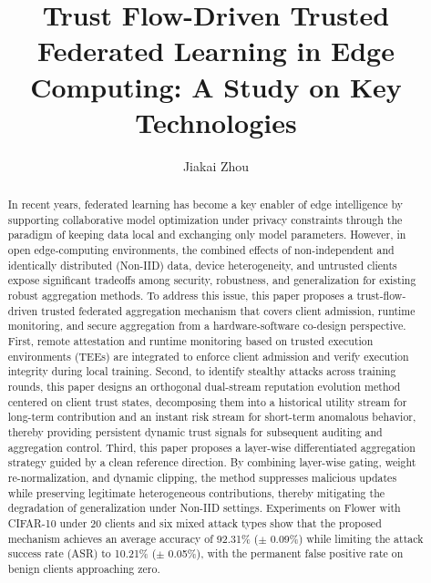 \documentclass[runningheads,orivec]{llncs}
\begin{document}
\title{Trust Flow-Driven Trusted Federated Learning in Edge Computing: A Study on Key Technologies}

\author{Jiakai Zhou}
\institute{}

\maketitle

\begin{abstract}
    In recent years, federated learning has become a key enabler of edge
    intelligence by supporting collaborative model optimization under privacy
    constraints through the paradigm of keeping data local and exchanging only
    model parameters. However, in open edge-computing environments, the combined
    effects of non-independent and identically distributed (Non-IID) data,
    device heterogeneity, and untrusted clients expose significant tradeoffs
    among security, robustness, and generalization for existing robust
    aggregation methods. To address this issue, this paper proposes a trust-flow-driven
    trusted federated aggregation mechanism that covers client admission, runtime
    monitoring, and secure aggregation from a hardware-software co-design
    perspective. First, remote attestation and runtime monitoring based on
    trusted execution environments (TEEs) are integrated to enforce client
    admission and verify execution integrity during local training. Second, to
    identify stealthy attacks across training rounds, this paper designs an orthogonal
    dual-stream reputation evolution method centered on client trust states,
    decomposing them into a historical utility stream for long-term contribution
    and an instant risk stream for short-term anomalous behavior, thereby
    providing persistent dynamic trust signals for subsequent auditing and
    aggregation control. Third, this paper proposes a layer-wise
    differentiated aggregation strategy guided by a clean reference direction.
    By combining layer-wise gating, weight re-normalization, and dynamic
    clipping, the method suppresses malicious updates while preserving legitimate
    heterogeneous contributions, thereby mitigating the degradation of
    generalization under Non-IID settings. Experiments on Flower with CIFAR-10
    under 20 clients and six mixed attack types show that the proposed mechanism
    achieves an average accuracy of 92.31\% ($\pm$ 0.09\%) while limiting the
    attack success rate (ASR) to 10.21\% ($\pm$ 0.05\%), with the permanent false
    positive rate on benign clients approaching zero.
\end{abstract}
\end{document}
